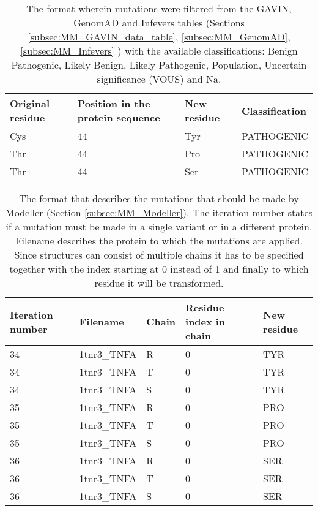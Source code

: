 
\begin{table}[ht]
	\begin{tabular}{ l | l | l | l}
		Original residue & Position in the protein sequence & New residue & Classification\\ \hline
		Cys & 44 & Tyr & PATHOGENIC\\
		Thr & 44 & Pro & PATHOGENIC\\
		Thr & 44 & Ser & PATHOGENIC\\
	\end{tabular}
	\caption{The format wherein mutations were filtered from the GAVIN, GenomAD and Infevers tables (Sections \ref{subsec:MM_GAVIN_data_table},  \ref{subsec:MM_GenomAD}, \ref{subsec:MM_Infevers} ) with the available classifications: Benign Pathogenic, Likely Benign, Likely Pathogenic, Population, Uncertain significance (VOUS) and Na.}
	\label{table:Res_Filtered_Mutations}
\end{table}

\begin{table}[ht]
	\begin{tabular}{ l | l | l | l | l}
		Iteration number & Filename & Chain & Residue index in chain & New residue\\ \hline
		34 & 1tnr3\_TNFA & R & 0 & TYR\\
		34 & 1tnr3\_TNFA & T & 0 & TYR\\
		34 & 1tnr3\_TNFA & S & 0 & TYR\\
		35 & 1tnr3\_TNFA & R & 0 & PRO\\
		35 & 1tnr3\_TNFA & T & 0 & PRO\\
		35 & 1tnr3\_TNFA & S & 0 & PRO\\
		36 & 1tnr3\_TNFA & R & 0 & SER\\
		36 & 1tnr3\_TNFA & T & 0 & SER\\
		36 & 1tnr3\_TNFA & S & 0 & SER\\
	\end{tabular}
	\caption{The format that describes the mutations that should be made by Modeller (Section \ref{subsec:MM_Modeller}). The iteration number states if a mutation must be made in a single variant or in a different protein. Filename describes the protein to which the mutations are applied. Since structures can consist of multiple chains it has to be specified together with the index starting at 0 instead of 1 and finally to which residue it will be transformed.}
		\label{table:Res_Modeller_Mutation_Format}
\end{table}

